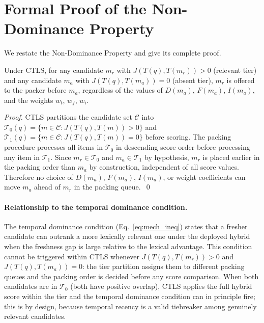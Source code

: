 \clearpage

\section{Formal Proof of the Non-Dominance Property}
\label{app:proof}

We restate the Non-Dominance Property and give its complete proof.

\begin{theorem}
Under CTLS, for any candidate $m_r$ with $J(T(q),T(m_r)) > 0$ (relevant tier) and any candidate
$m_a$ with $J(T(q),T(m_a)) = 0$ (absent tier), $m_r$ is offered to the packer before $m_a$,
regardless of the values of $D(m_a)$, $F(m_a)$, $I(m_a)$, and the weights $w_t$, $w_f$, $w_i$.
\end{theorem}

\begin{proof}
CTLS partitions the candidate set $\mathcal{C}$ into
$\mathcal{T}_0(q) = \{m \in \mathcal{C} : J(T(q),T(m)) > 0\}$ and
$\mathcal{T}_1(q) = \{m \in \mathcal{C} : J(T(q),T(m)) = 0\}$ before scoring.
The packing procedure processes all items in $\mathcal{T}_0$ in descending score order before
processing any item in $\mathcal{T}_1$. Since $m_r \in \mathcal{T}_0$ and $m_a \in \mathcal{T}_1$
by hypothesis, $m_r$ is placed earlier in the packing order than $m_a$ by construction, independent
of all score values. Therefore no choice of $D(m_a)$, $F(m_a)$, $I(m_a)$, or weight coefficients
can move $m_a$ ahead of $m_r$ in the packing queue.~\qed
\end{proof}

\paragraph{Relationship to the temporal dominance condition.}
The temporal dominance condition (Eq.~\ref{eq:mech_ineq}) states that a fresher candidate can
outrank a more lexically relevant one under the deployed hybrid when the freshness gap is large
relative to the lexical advantage. This condition cannot be triggered within CTLS whenever
$J(T(q),T(m_r)) > 0$ and $J(T(q),T(m_a)) = 0$: the tier partition assigns them to different
packing queues and the packing order is decided before any score comparison.
When both candidates are in $\mathcal{T}_0$ (both have positive overlap), CTLS applies the full
hybrid score within the tier and the temporal dominance condition can in principle fire; this is
by design, because temporal recency is a valid tiebreaker among genuinely relevant candidates.

